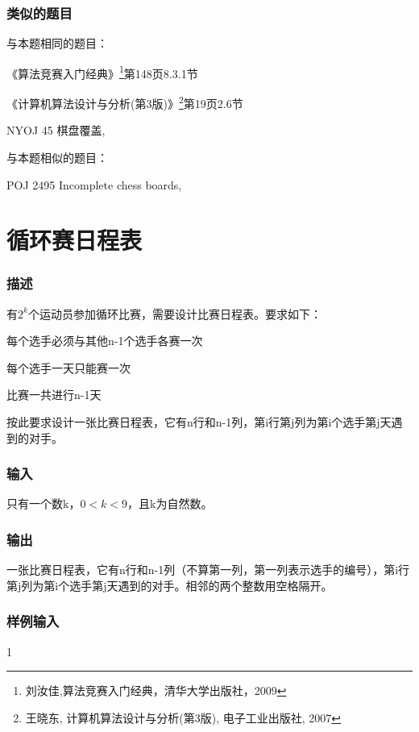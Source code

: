 \subsubsection{类似的题目}
与本题相同的题目：
\begindot
\item 《算法竞赛入门经典》\footnote{刘汝佳,算法竞赛入门经典，清华大学出版社，2009}第148页8.3.1节
\item 《计算机算法设计与分析(第3版)》\footnote{王晓东, 计算机算法设计与分析(第3版), 电子工业出版社, 2007}第19页2.6节
\item NYOJ 45 棋盘覆盖, 
\myenddot

与本题相似的题目：
\begindot
\item POJ 2495 Incomplete chess boards, 
\myenddot


\section{循环赛日程表} %
\subsubsection{描述}
有$2^k$个运动员参加循环比赛，需要设计比赛日程表。要求如下：

\begindot
\item 每个选手必须与其他n-1个选手各赛一次
\item 每个选手一天只能赛一次
\item 比赛一共进行n-1天
\myenddot

按此要求设计一张比赛日程表，它有n行和n-1列，第i行第j列为第i个选手第j天遇到的对手。

\subsubsection{输入}
只有一个数k，$0<k<9$，且k为自然数。

\subsubsection{输出}
一张比赛日程表，它有n行和n-1列（不算第一列，第一列表示选手的编号），第i行第j列为第i个选手第j天遇到的对手。相邻的两个整数用空格隔开。

\subsubsection{样例输入}
\begin{Code}
1
\end{Code}

